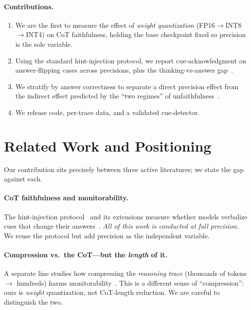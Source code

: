 \documentclass[11pt]{article}
\begin{document}
\paragraph{Contributions.}
\begin{enumerate}
  \item We are the first to measure the effect of \emph{weight quantization}
        (FP16$\to$INT8$\to$INT4) on CoT faithfulness, holding the base checkpoint
        fixed so precision is the sole variable.
  \item Using the standard hint-injection protocol, we report cue-acknowledgment
        on answer-flipping cases across precisions, plus the thinking-vs-answer
        gap~\cite{whymodelsknow2026}.
  \item We stratify by answer correctness to separate a direct precision effect
        from the indirect effect predicted by the ``two regimes'' of
        unfaithfulness~\cite{tworegimes2026}.
  \item We release code, per-trace data, and a validated cue-detector.
\end{enumerate}

\section{Related Work and Positioning}
Our contribution sits precisely between three active literatures; we state the
gap against each.

\paragraph{CoT faithfulness and monitorability.}
The hint-injection protocol~\cite{turpin2023,lanham2023} and its extensions
measure whether models verbalize cues that change their
answers~\cite{anthropic2025reasoning,lietome2026,monitorability2025,faithcotbench2026,bonafide2026}.
\emph{All of this work is conducted at full precision.} We reuse the protocol but
add precision as the independent variable.

\paragraph{Compression vs.\ the CoT---but the \emph{length} of it.}
A separate line studies how compressing the \emph{reasoning trace} (thousands of
tokens $\to$ hundreds) harms monitorability~\cite{monitorabilitytax2026,lengthpenalties2026}.
This is a different sense of ``compression'': ours is \emph{weight} quantization,
not CoT-length reduction. We are careful to distinguish the two.
\end{document}
